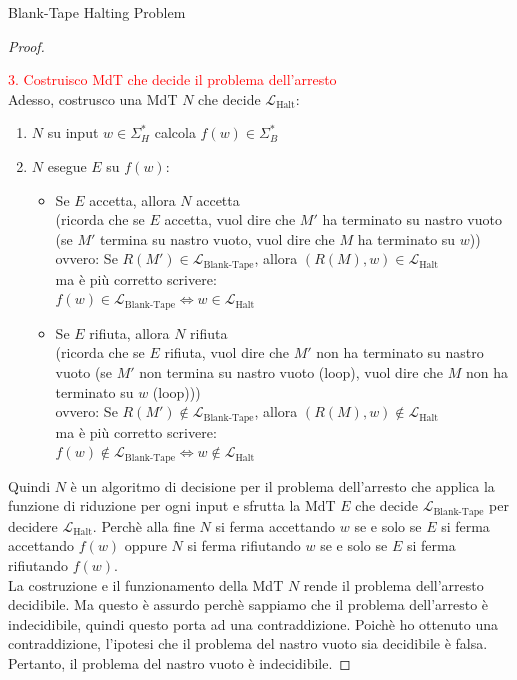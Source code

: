 \documentclass{article}  %
\theoremstyle{definition}
\begin{document}
\begin{theorem}{Blank-Tape Halting Problem}
\begin{proof}
\begin{enumerate}
    \end{enumerate}
    \textcolor{red}{3. Costruisco MdT che decide il problema dell'arresto} \\
    Adesso, costrusco una MdT $N$ che decide $\mathcal{L}_{\text{Halt}}$:
    \begin{enumerate}
      \item $N$ su input $w \in \Sigma_H^*$ calcola $f(w) \in \Sigma_B^*$
      \item $N$ esegue $E$ su $f(w)$:
      \begin{itemize}
        \item Se $E$ accetta, allora $N$ accetta \\
        (ricorda che se $E$ accetta, vuol dire che $M'$ ha terminato su nastro vuoto (se $M'$ termina su nastro vuoto, vuol
        dire che $M$ ha terminato su $w$))
        ovvero: Se $R(M') \in \mathcal{L}_{\text{Blank-Tape}}$, allora $(R(M),w) \in \mathcal{L}_{\text{Halt}}$ \\
        ma è più corretto scrivere: \\
        $f(w) \in \mathcal{L}_{\text{Blank-Tape}} \iff w \in \mathcal{L}_{\text{Halt}}$
        \item Se $E$ rifiuta, allora $N$ rifiuta \\
        (ricorda che se $E$ rifiuta, vuol dire che $M'$ non ha terminato su nastro vuoto (se $M'$ non termina su nastro vuoto (loop), vuol
        dire che $M$ non ha terminato su $w$ (loop))) \\ 
        ovvero: Se $R(M') \notin \mathcal{L}_{\text{Blank-Tape}}$, allora $(R(M),w) \notin \mathcal{L}_{\text{Halt}}$ \\
        ma è più corretto scrivere: \\
        $f(w) \notin \mathcal{L}_{\text{Blank-Tape}} \iff w \notin \mathcal{L}_{\text{Halt}}$
      \end{itemize} 
    \end{enumerate}
  Quindi $N$ è un algoritmo di decisione per il problema dell'arresto che applica la funzione di riduzione per ogni input e sfrutta
  la MdT $E$ che decide $\mathcal{L}_{\text{Blank-Tape}}$ per decidere $\mathcal{L}_{\text{Halt}}$. Perchè alla fine $N$ si ferma
  accettando $w$ se e solo se $E$ si ferma accettando $f(w)$ oppure $N$ si ferma
  rifiutando $w$ se e solo se $E$ si ferma rifiutando $f(w)$. \\
  La costruzione e il funzionamento della MdT $N$ rende il problema dell'arresto decidibile. Ma questo è assurdo perchè sappiamo
  che il problema dell'arresto è indecidibile, quindi questo porta ad una contraddizione. Poichè ho ottenuto una contraddizione, l'ipotesi 
  che il problema del nastro vuoto sia decidibile è falsa. Pertanto, il problema del nastro vuoto è indecidibile. 


\end{proof}
\end{theorem}
\end{document}
